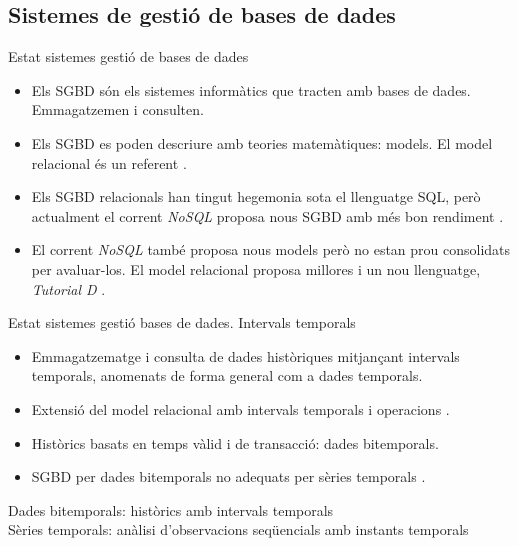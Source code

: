 \subsection[SGBD]{Sistemes de gestió de bases de dades}
\begin{frame}{Estat sistemes gestió de bases de dades}

  \begin{itemize}  

  \item Els SGBD són els sistemes informàtics que tracten amb bases de
    dades. Emmagatzemen i consulten.

  \item Els SGBD es poden descriure amb teories matemàtiques: models. El model
    relacional és un referent \parencite{date:introduction}. 

  \item Els SGBD relacionals han tingut hegemonia sota el llenguatge
    SQL, però actualment el corrent \emph{NoSQL} proposa nous SGBD amb
    més bon rendiment \parencite{stonebraker10}.


  \item El corrent \emph{NoSQL} també proposa nous models però no
    estan prou consolidats per avaluar-los. El model relacional
    proposa millores i un nou llenguatge, \emph{Tutorial
      D} \parencite{date06,date:thethirdmanifesto}.

  \end{itemize}
  
\end{frame}


\begin{frame}{Estat sistemes gestió bases de dades. Intervals temporals}

  \begin{itemize}  

  \item Emmagatzematge i consulta de dades històriques mitjançant
    intervals temporals, anomenats de forma general com a dades
    temporals.

  \item Extensió del model relacional amb intervals temporals i
    operacions \parencite{date02:_tempor_data_relat_model}.

  \item Històrics basats en temps vàlid i de transacció: dades
    bitemporals.

  \item SGBD per dades bitemporals no adequats per sèries
    temporals \parencite{schmidt95}.
  \end{itemize}
    

  Dades bitemporals: històrics amb intervals temporals\\
  Sèries temporals: anàlisi d'observacions seqüencials amb instants
  temporals

\end{frame}



